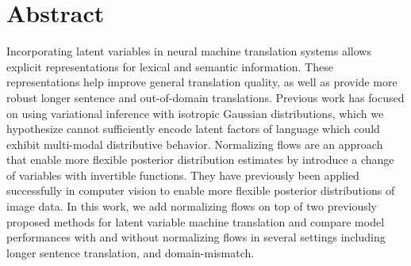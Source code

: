 
\chapter{Abstract}

Incorporating latent variables in neural machine translation systems allows explicit representations for lexical and semantic information. These representations help improve general translation quality, as well as provide more robust longer sentence and out-of-domain translations. Previous work has focused on using variational inference with isotropic Gaussian distributions, which we hypothesize cannot sufficiently encode latent factors of language which could exhibit multi-modal distributive behavior. Normalizing flows are an approach that enable more flexible posterior distribution estimates by introduce a change of variables with invertible functions. They have previously been applied successfully in computer vision to enable more flexible posterior distributions of image data. In this work, we add normalizing flows on top of two previously proposed methods for latent variable machine translation and compare model performances with and without normalizing flows in several settings including longer sentence translation, and domain-mismatch.  %


